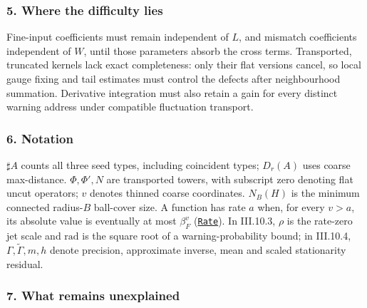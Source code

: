 \documentclass[
  letterpaper,
  11pt]{article}
\begin{document}
\subsubsection{5. Where the difficulty
lies}\label{where-the-difficulty-lies-12}

Fine-input coefficients must remain independent of \(L\), and mismatch
coefficients independent of \(W\), until those parameters absorb the
cross terms. Transported, truncated kernels lack exact completeness:
only their flat versions cancel, so local gauge fixing and tail
estimates must control the defects after neighbourhood summation.
Derivative integration must also retain a gain for every distinct
warning address under compatible fluctuation transport.

\subsubsection{6. Notation}\label{notation-12}

\(\sharp A\) counts all three seed types, including coincident types;
\(D_r(A)\) uses coarse max-distance. \(\Phi,\Phi',N\) are transported
towers, with subscript zero denoting flat uncut operators; \(v\) denotes
thinned coarse coordinates. \(N_B(H)\) is the minimum connected
radius-\(B\) ball-cover size. A function has rate \(a\) when, for every
\(v>a\), its absolute value is eventually at most \(\beta_F^v\)
(\href{https://github.com/yang-mills-group/OpenAI-YM-20261028/blob/3456e5e75cf8d4cd558955a5c7638fba2d68f464/YM/AnalyticNext/CONNECTED_ACTIVITY_JETS_E6/Numerics.lean\#L22-L23}{\texttt{Rate}}).
In III.10.3, \(\rho\) is the rate-zero jet scale and \(\mathrm{rad}\) is
the square root of a warning-probability bound; in III.10.4,
\(\Gamma,\widetilde\Gamma,m,h\) denote precision, approximate inverse,
mean and scaled stationarity residual.

\subsubsection{7. What remains
unexplained}\label{what-remains-unexplained-12}
\end{document}
